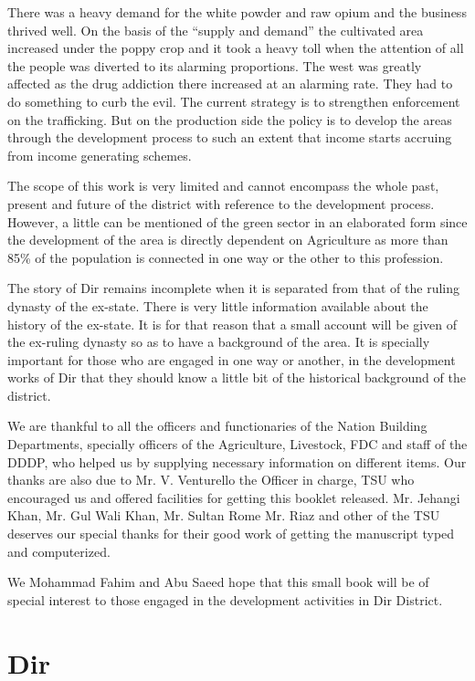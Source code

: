 \documentclass[twoside,openright]{book}
\begin{document}
There was a heavy demand for the white powder and raw opium and the business
thrived well. On the basis of the ``supply and demand'' the cultivated area
increased under the poppy crop and it took a heavy toll when the attention of
all the people was diverted to its alarming proportions. The west was greatly
affected as the drug addiction there increased at an alarming rate. They had to
do something to curb the evil. The current strategy is to strengthen enforcement
on the trafficking. But on the production side the policy is to develop the
areas through the development process to such an extent that income starts
accruing from income generating schemes.

The scope of this work is very limited and cannot encompass the whole past,
present and future of the district with reference to the development process.
However, a little can be mentioned of the green sector in an elaborated form
since the development of the area is directly dependent on Agriculture as more
than 85\% of the population is connected in one way or the other to this
profession.

The story of Dir remains incomplete when it is separated from that of the ruling
dynasty of the ex-state. There is very little information available about the
history of the ex-state. It is for that reason that a small account will be
given of the ex-ruling dynasty so as to have a background of the area. It is
specially important for those who are engaged in one way or another, in the
development works of Dir that they should know a little bit of the historical
background of the district.

We are thankful to all the officers and functionaries of the Nation Building
Departments, specially officers of the Agriculture, Livestock, FDC and staff of
the DDDP, who helped us by supplying necessary information on different items.
Our thanks are also due to Mr. V. Venturello the Officer in charge, TSU who
encouraged us and offered facilities for getting this booklet released. Mr.
Jehangi Khan, Mr. Gul Wali Khan, Mr. Sultan Rome Mr. Riaz and other of the TSU
deserves our special thanks for their good work of getting the manuscript typed
and computerized.

We Mohammad Fahim and Abu Saeed hope that this small book will be of special
interest to those engaged in the development activities in Dir District.


\chapter{Dir}
\end{document}

